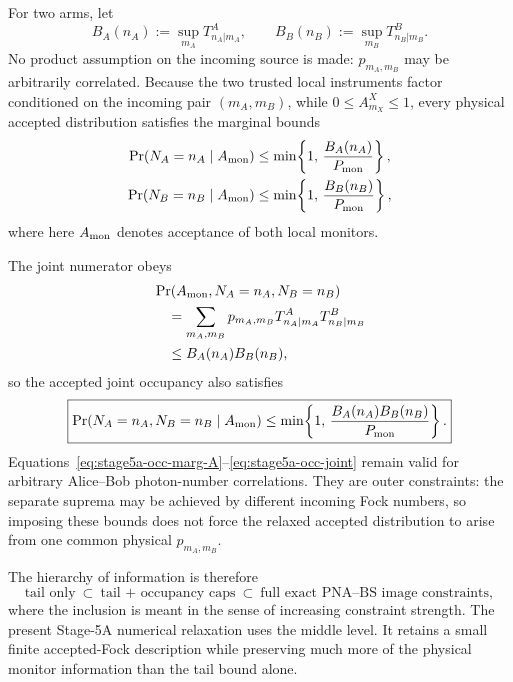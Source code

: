 \documentclass[11pt]{article}
\theoremstyle{remark}
\begin{document}
For two arms, let
\[
    B_A(n_A)
    :=
    \sup_{m_A}
    T^A_{n_A|m_A},
    \qquad
    B_B(n_B)
    :=
    \sup_{m_B}
    T^B_{n_B|m_B}.
\]
No product assumption on the incoming source is made:
\(p_{m_A,m_B}\) may be arbitrarily correlated.  Because the two trusted local
instruments factor conditioned on the incoming pair \((m_A,m_B)\), while
\(0\le A^X_{m_X}\le1\), every physical accepted distribution satisfies the
marginal bounds
\begin{align}
    \Pr(N_A=n_A\mid A_{\rm mon})
    &\le
    \min\!\left\{
      1,\,
      \frac{B_A(n_A)}{P_{\rm mon}}
    \right\},
    \label{eq:stage5a-occ-marg-A}
    \\
    \Pr(N_B=n_B\mid A_{\rm mon})
    &\le
    \min\!\left\{
      1,\,
      \frac{B_B(n_B)}{P_{\rm mon}}
    \right\},
    \label{eq:stage5a-occ-marg-B}
\end{align}
where here \(A_{\rm mon}\) denotes acceptance of both local monitors.

The joint numerator obeys
\begin{align}
    &\Pr(
      A_{\rm mon},
      N_A=n_A,
      N_B=n_B
    )
    \nonumber\\
    &\quad=
    \sum_{m_A,m_B}
      p_{m_A,m_B}
      T^A_{n_A|m_A}
      T^B_{n_B|m_B}
    \nonumber\\
    &\quad\le
    B_A(n_A)B_B(n_B),
\end{align}
so the accepted joint occupancy also satisfies
\begin{equation}
    \boxed{
    \Pr(
      N_A=n_A,N_B=n_B
      \mid A_{\rm mon}
    )
    \le
    \min\!\left\{
      1,\,
      \frac{
        B_A(n_A)B_B(n_B)
      }{
        P_{\rm mon}
      }
    \right\}.
    }
    \label{eq:stage5a-occ-joint}
\end{equation}
Equations~\eqref{eq:stage5a-occ-marg-A}--\eqref{eq:stage5a-occ-joint}
remain valid for arbitrary Alice--Bob photon-number correlations.  They are
outer constraints: the separate suprema may be achieved by different incoming
Fock numbers, so imposing these bounds does not force the relaxed accepted
distribution to arise from one common physical \(p_{m_A,m_B}\).

The hierarchy of information is therefore
\begin{equation}
    \boxed{
    \text{tail only}
    \ \subset\
    \text{tail + occupancy caps}
    \ \subset\
    \text{full exact PNA--BS image constraints},
    }
    \label{eq:stage5a-information-hierarchy}
\end{equation}
where the inclusion is meant in the sense of increasing constraint strength.
The present Stage-5A numerical relaxation uses the middle level.  It retains
a small finite accepted-Fock description while preserving much more of the
physical monitor information than the tail bound alone.
\end{document}
